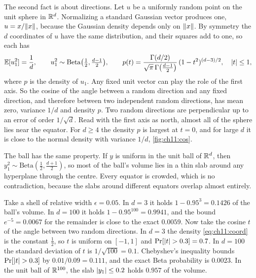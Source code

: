 The second fact is about directions. Let $u$ be a uniformly random point on the unit sphere in $\mathbb{R}^d$. Normalizing a standard Gaussian vector produces one, $u=x/\lVert x\rVert$, because the Gaussian density depends only on $\lVert x\rVert$. By symmetry the $d$ coordinates of $u$ have the same distribution, and their squares add to one, so each has
\begin{equation}\label{eq:ch11:coord}
\mathbb{E}[u_1^2]=\frac1d,\qquad u_1^2\sim\mathrm{Beta}\big(\tfrac12,\tfrac{d-1}2\big),\qquad
p(t)=\frac{\Gamma(d/2)}{\sqrt\pi\,\Gamma\big(\frac{d-1}2\big)}\,(1-t^2)^{(d-3)/2},\quad \lvert t\rvert\le1,
\end{equation}
where $p$ is the density of $u_1$. Any fixed unit vector can play the role of the first axis. So the cosine of the angle between a random direction and any fixed direction, and therefore between two independent random directions, has mean zero, variance $1/d$ and density $p$. Two random directions are perpendicular up to an error of order $1/\sqrt d$. Read with the first axis as north, almost all of the sphere lies near the equator. For $d\ge4$ the density $p$ is largest at $t=0$, and for large $d$ it is close to the normal density with variance $1/d$, \cref{fig:ch11:cos}.

The ball has the same property. If $y$ is uniform in the unit ball of $\mathbb{R}^d$, then $y_1^2\sim\mathrm{Beta}(\frac12,\frac{d+1}2)$, so most of the ball's volume lies in a thin slab around any hyperplane through the centre. Every equator is crowded, which is no contradiction, because the slabs around different equators overlap almost entirely.

\begin{example}\label{ex:ch11:ball}
Take a shell of relative width $\epsilon=0.05$. In $d=3$ it holds $1-0.95^3=0.1426$ of the ball's volume. In $d=100$ it holds $1-0.95^{100}=0.9941$, and the bound $e^{-5}=0.0067$ for the remainder is close to the exact $0.0059$. Now take the cosine $t$ of the angle between two random directions. In $d=3$ the density \cref{eq:ch11:coord} is the constant $\frac12$, so $t$ is uniform on $[-1,1]$ and $\Pr[\lvert t\rvert>0.3]=0.7$. In $d=100$ the standard deviation of $t$ is $1/\sqrt{100}=0.1$. Chebyshev's inequality bounds $\Pr[\lvert t\rvert>0.3]$ by $0.01/0.09=0.111$, and the exact Beta probability is $0.0023$. In the unit ball of $\mathbb{R}^{100}$, the slab $\lvert y_1\rvert\le0.2$ holds $0.957$ of the volume.
\end{example}

